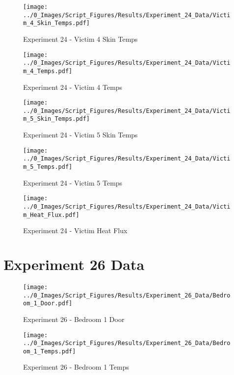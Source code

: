 	\begin{figure}[H]
		\centering
		\texttt{[image: ../0\_Images/Script\_Figures/Results/Experiment\_24\_Data/Victim\_4\_Skin\_Temps.pdf]}
		\caption[]{Experiment 24 - Victim 4 Skin Temps}
	\end{figure}
 
	\clearpage

	\begin{figure}[H]
		\centering
		\texttt{[image: ../0\_Images/Script\_Figures/Results/Experiment\_24\_Data/Victim\_4\_Temps.pdf]}
		\caption[]{Experiment 24 - Victim 4 Temps}
	\end{figure}
 

	\begin{figure}[H]
		\centering
		\texttt{[image: ../0\_Images/Script\_Figures/Results/Experiment\_24\_Data/Victim\_5\_Skin\_Temps.pdf]}
		\caption[]{Experiment 24 - Victim 5 Skin Temps}
	\end{figure}
 
	\clearpage

	\begin{figure}[H]
		\centering
		\texttt{[image: ../0\_Images/Script\_Figures/Results/Experiment\_24\_Data/Victim\_5\_Temps.pdf]}
		\caption[]{Experiment 24 - Victim 5 Temps}
	\end{figure}
 

	\begin{figure}[H]
		\centering
		\texttt{[image: ../0\_Images/Script\_Figures/Results/Experiment\_24\_Data/Victim\_Heat\_Flux.pdf]}
		\caption[]{Experiment 24 - Victim Heat Flux}
	\end{figure}
 
	\clearpage

\clearpage		\large
\section{Experiment 26 Data} \label{App:Exp26Results} 

	\begin{figure}[H]
		\centering
		\texttt{[image: ../0\_Images/Script\_Figures/Results/Experiment\_26\_Data/Bedroom\_1\_Door.pdf]}
		\caption[]{Experiment 26 - Bedroom 1 Door}
	\end{figure}
 

	\begin{figure}[H]
		\centering
		\texttt{[image: ../0\_Images/Script\_Figures/Results/Experiment\_26\_Data/Bedroom\_1\_Temps.pdf]}
		\caption[]{Experiment 26 - Bedroom 1 Temps}
	\end{figure}
 
